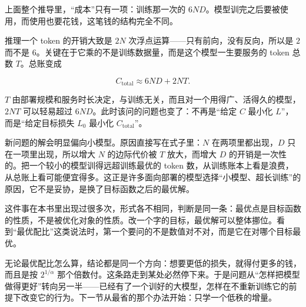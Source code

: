 上面整个推导里，``成本''只有一项：训练那一次的 \(6ND\)。模型训完之后要被使用，而使用也要花钱，这笔钱的结构完全不同。

推理一个 token 的开销大致是 \(2N\) 次浮点运算——只有前向，没有反向，所以是 \(2\) 而不是 \(6\)。关键在于它乘的不是训练数据量，而是这个模型一生要服务的 token 总数 \(T\)。总账变成

\[
  C_{\text{total}} \approx 6ND + 2NT .
\]

\(T\) 由部署规模和服务时长决定，与训练无关，而且对一个用得广、活得久的模型，\(2NT\) 可以轻易超过 \(6ND\)。此时该问的问题也变了：不再是``给定 \(C\) 最小化 \(L\)''，而是``给定目标损失 \(L_0\) 最小化 \(C_{\text{total}}\)''。

新问题的解会明显偏向小模型。原因直接写在式子里：\(N\) 在两项里都出现，\(D\) 只在一项里出现，所以增大 \(N\) 的边际代价被 \(T\) 放大，而增大 \(D\) 的开销是一次性的。把一个较小的模型训得远超训练最优的 token 数，从训练账本上看是浪费，从总账上看可能便宜得多。这正是许多面向部署的模型选择``小模型、超长训练''的原因，它不是妥协，是换了目标函数之后的最优解。

这件事在本书里出现过很多次，形式各不相同，判断是同一条：最优点是目标函数的性质，不是被优化对象的性质。改一个字的目标，最优解可以整体挪位。看到``最优配比''这类说法时，第一个要问的不是数值对不对，而是它在对哪个目标最优。

\medskip

无论最优配比怎么算，结论都是同一个方向：想要更低的损失，就得付更多的钱，而且是按 \(2^{1/\alpha}\) 那个倍数付。这条路走到某处必然停下来。于是问题从``怎样把模型做得更好''转向另一半——已经有了一个训好的大模型，怎样在不重新训练它的前提下改变它的行为。下一节从最省的那个办法开始：只学一个低秩的增量。
